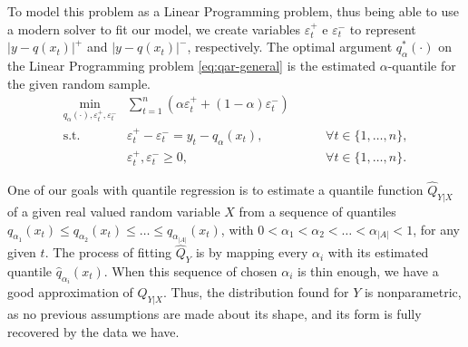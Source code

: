 To model this problem as a Linear Programming problem, thus being able to use a modern solver to fit our model,  we create variables $\varepsilon^+_t$ e $\varepsilon^-_t$ to represent $|y-q(x_t)|^+$ and $|y-q(x_t)|^-$, respectively. The optimal argument $q_\alpha^*(\cdot)$ on the Linear Programming problem \ref{eq:qar-general} is the estimated $\alpha$-quantile for the given random sample.
\begin{equation}
\begin{aligned}\min_{q_\alpha (\cdot),\varepsilon_{t}^{+}, \varepsilon_{t}^{-}} & \sum_{t=1}^{n}\left(\alpha \varepsilon_{t}^{+}+(1-\alpha)\varepsilon_{t}^{-}\right) & \\
\mbox{s.t. } & \varepsilon_{t}^{+}-\varepsilon_{t}^{-}=y_{t}-q_\alpha(x_{t}), & \qquad\forall t \in \{1,\dots,n\},\\
& \varepsilon_t^+,\varepsilon_t^- \geq 0, & \qquad \forall t \in \{1,\dots,n\}.
\end{aligned}
\label{eq:qar-general}
\end{equation}

One of our goals with quantile regression is to estimate a quantile function $\hat{Q}_{Y|X}$ of a given real valued random variable $X$ from a sequence of quantiles $q_{\alpha_1}(x_t) \leq q_{\alpha_2}(x_t) \leq \dots \leq q_{\alpha_{|A|}}(x_t)$, with $0 < \alpha_1 < \alpha_2 < \dots < \alpha_{|A|} < 1$, for any given $t$.
The process of fitting $\hat{Q}_Y$ is by mapping every $\alpha_i$ with its estimated quantile $\hat{q}_{\alpha_i}(x_t)$.
When this sequence of chosen $\alpha_i$ is thin enough, we have a good approximation of $Q_{Y|X}$.
Thus, the distribution found for $Y$ is nonparametric, as no previous assumptions are made about its shape, and its form is fully recovered by the data we have.

